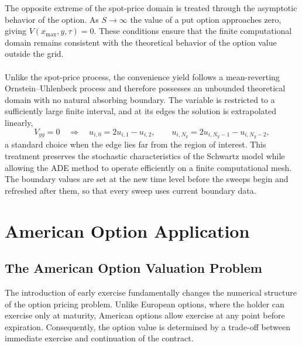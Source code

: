 \documentclass[12pt,a4paper]{article}
\begin{document}
The opposite extreme of the spot-price domain is treated through the asymptotic behavior of the option. As $S\to\infty$ the value of a put option approaches zero, giving $V(x_{\max},y,\tau)=0$. These conditions ensure that the finite computational domain remains consistent with the theoretical behavior of the option value outside the grid.\\\\
Unlike the spot-price process, the convenience yield follows a mean-reverting Ornstein--Uhlenbeck process and therefore possesses an unbounded theoretical domain with no natural absorbing boundary. The variable is restricted to a sufficiently large finite interval, and at its edges the solution is extrapolated linearly,
\begin{equation}
V_{yy}=0\quad\Longrightarrow\quad u_{i,0}=2u_{i,1}-u_{i,2},\qquad u_{i,N_y}=2u_{i,N_y-1}-u_{i,N_y-2},
\end{equation}
a standard choice when the edge lies far from the region of interest. This treatment preserves the stochastic characteristics of the Schwartz model while allowing the ADE method to operate efficiently on a finite computational mesh. The boundary values are set at the new time level before the sweeps begin and refreshed after them, so that every sweep uses current boundary data.

\newpage


\section{American Option Application}\label{ch:american}

\subsection{The American Option Valuation Problem}

The introduction of early exercise fundamentally changes the numerical structure of the option pricing problem. Unlike European options, where the holder can exercise only at maturity, American options allow exercise at any point before expiration. Consequently, the option value is determined by a trade-off between immediate exercise and continuation of the contract.
\end{document}
